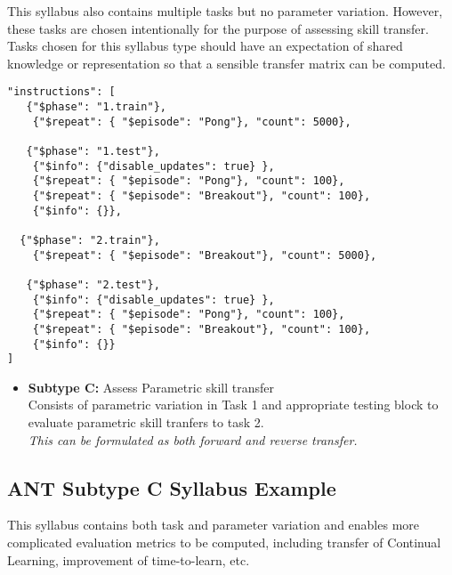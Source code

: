 This syllabus also contains multiple tasks but no parameter variation. However, these tasks are chosen intentionally for the purpose of assessing skill transfer. Tasks chosen for this syllabus type should have an expectation of shared knowledge or representation so that a sensible transfer matrix can be computed.

\begin{small}
\begin{verbatim}
"instructions": [    
   {"$phase": "1.train"}, 
    {"$repeat": { "$episode": "Pong"}, "count": 5000}, 

   {"$phase": "1.test"},   
    {"$info": {"disable_updates": true} },
    {"$repeat": { "$episode": "Pong"}, "count": 100},  
    {"$repeat": { "$episode": "Breakout"}, "count": 100},  
    {"$info": {}},
   
  {"$phase": "2.train"},  
    {"$repeat": { "$episode": "Breakout"}, "count": 5000},

   {"$phase": "2.test"},   
    {"$info": {"disable_updates": true} },
    {"$repeat": { "$episode": "Pong"}, "count": 100},
    {"$repeat": { "$episode": "Breakout"}, "count": 100}, 
    {"$info": {}}
]

\end{verbatim}
\end{small}

\begin{itemize}            
    \item \textbf{Subtype C:} Assess Parametric skill transfer\\
        Consists of parametric variation in Task 1 and appropriate testing block to evaluate parametric skill tranfers to task 2.\\
        \textit{This can be formulated as both forward and reverse transfer.}\\
\end{itemize}

\subsection*{ANT Subtype C Syllabus Example}

This syllabus contains both task and parameter variation and enables more complicated evaluation metrics to be computed, including transfer of Continual Learning, improvement of time-to-learn, etc.

